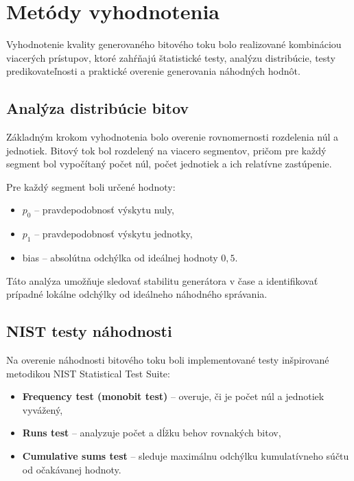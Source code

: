 \section{Metódy vyhodnotenia}


Vyhodnotenie kvality generovaného bitového toku bolo realizované kombináciou viacerých prístupov, ktoré zahŕňajú štatistické testy, analýzu distribúcie, testy predikovateľnosti a praktické overenie generovania náhodných hodnôt.


\subsection{Analýza distribúcie bitov}


Základným krokom vyhodnotenia bolo overenie rovnomernosti rozdelenia núl a jednotiek. Bitový tok bol rozdelený na viacero segmentov, pričom pre každý segment bol vypočítaný počet núl, počet jednotiek a ich relatívne zastúpenie.


Pre každý segment boli určené hodnoty:

\begin{itemize}

  \item $p_0$ – pravdepodobnosť výskytu nuly,

  \item $p_1$ – pravdepodobnosť výskytu jednotky,

  \item bias – absolútna odchýlka od ideálnej hodnoty $0{,}5$.

\end{itemize}


Táto analýza umožňuje sledovať stabilitu generátora v čase a identifikovať prípadné lokálne odchýlky od ideálneho náhodného správania.


\subsection{NIST testy náhodnosti}


Na overenie náhodnosti bitového toku boli implementované testy inšpirované metodikou NIST Statistical Test Suite:


\begin{itemize}

  \item \textbf{Frequency test (monobit test)} – overuje, či je počet núl a jednotiek vyvážený,

  \item \textbf{Runs test} – analyzuje počet a dĺžku behov rovnakých bitov,

  \item \textbf{Cumulative sums test} – sleduje maximálnu odchýlku kumulatívneho súčtu od očakávanej hodnoty.

\end{itemize}


